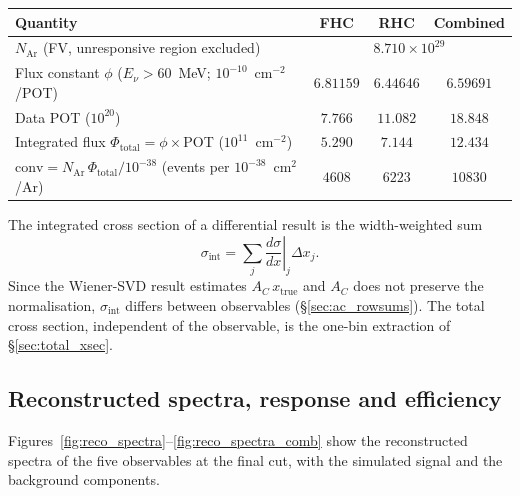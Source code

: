 \documentclass[11pt,a4paper]{article}
\begin{document}
\begin{center}\small
\begin{tabular}{lccc}
\toprule
Quantity & FHC & RHC & Combined \\
\midrule
$N_{\mathrm{Ar}}$ (FV, unresponsive region excluded) & \multicolumn{3}{c}{$8.710\times10^{29}$} \\
Flux constant $\phi$ ($E_\nu>60$~MeV; $10^{-10}$~cm$^{-2}$/POT) & $6.81159$ & $6.44646$ & $6.59691$ \\
Data POT ($10^{20}$)                         & $7.766$ & $11.082$ & $18.848$ \\
Integrated flux $\Phi_{\mathrm{total}} = \phi\times$POT ($10^{11}$~cm$^{-2}$) & $5.290$ & $7.144$ & $12.434$ \\
$\mathrm{conv} = N_{\mathrm{Ar}}\,\Phi_{\mathrm{total}}/10^{-38}$ (events per $10^{-38}$~cm$^2$/Ar) & $4608$ & $6223$ & $10830$ \\
\bottomrule
\end{tabular}
\end{center}

\noindent The integrated cross section of a differential result is the width-weighted sum
\begin{equation}
  \sigma_{\mathrm{int}} = \sum_j \left.\frac{d\sigma}{dx}\right|_j \Delta x_j .
\end{equation}
Since the Wiener-SVD result estimates $A_C\,x_{\mathrm{true}}$ and $A_C$ does not preserve the
normalisation, $\sigma_{\mathrm{int}}$ differs between observables (\S\ref{sec:ac_rowsums}). The
total cross section, independent of the observable, is the one-bin extraction of
\S\ref{sec:total_xsec}.

\subsection{Reconstructed spectra, response and efficiency}
\label{sec:response_eff}

Figures~\ref{fig:reco_spectra}--\ref{fig:reco_spectra_comb} show the reconstructed spectra of the
five observables at the final cut, with the simulated signal and the background components.
\end{document}
